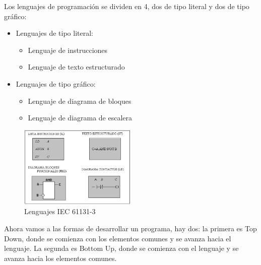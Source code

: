 \documentclass[12pt]{report}
\begin{document}
Los lenguajes de programación se dividen en 4, dos de tipo literal y dos de tipo gráfico:
\begin{itemize}
  \item Lenguajes de tipo literal:
  \begin{itemize}
    \item Lenguaje de instrucciones
    \item Lenguaje de texto estructurado
  \end{itemize}
  \item Lenguajes de tipo gráfico:
  \begin{itemize}
    \item Lenguaje de diagrama de bloques
    \item Lenguaje de diagrama de escalera
  \end{itemize}
\end{itemize}
\begin{figure}[h]
  \centering
  \includegraphics[width=0.5\textwidth]{Imagen_3.png}
  \caption{Lenguajes IEC 61131-3}
  \label{fig:mi_imagen_3}
\end{figure}

Ahora vamos a las formas de desarrollar un programa, hay dos: la primera es Top Down, donde se comienza con los elementos comunes y se avanza hacia el lenguaje. La segunda es Bottom Up, donde se comienza con el lenguaje y se avanza hacia los elementos comunes.
\newpage


\end{document}
